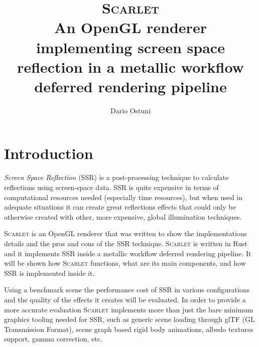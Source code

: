 \documentclass[11pt,a4paper]{report}
\begin{document}
\title{\textsc{Scarlet} \\ \large An OpenGL renderer implementing screen space reflection in a metallic workflow deferred rendering pipeline}
\author{Dario Ostuni}
\date{}
\maketitle

\tableofcontents

\chapter{Introduction}
\textit{Screen Space Reflection} (SSR) is a post-processing technique to calculate reflections using screen-space data. SSR is quite expensive in terms of computational resources needed (especially time resources), but when used in adequate situations it can create great reflections effects that could only be otherwise created with other, more expensive, global illumination techniques.

\textsc{Scarlet} is an OpenGL renderer that was written to show the implementations details and the pros and cons of the SSR technique. \textsc{Scarlet} is written in Rust and it implements SSR inside a metallic workflow deferred rendering pipeline. It will be shown how \textsc{Scarlet} functions, what are its main components, and how SSR is implemented inside it.

Using a benchmark scene the performance cost of SSR in various configurations and the quality of the effects it creates will be evaluated. In order to provide a more accurate evaluation \textsc{Scarlet} implements more than just the bare minimum graphics tooling needed for SSR, such as generic scene loading through glTF (GL Transmission Format), scene graph based rigid body animations, albedo textures support, gamma correction, etc.
\end{document}
